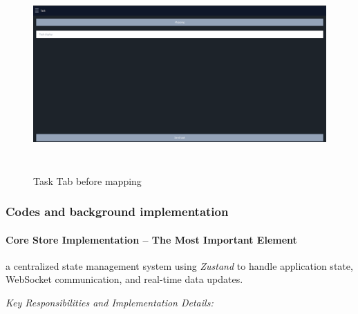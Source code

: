 \documentclass[../../main]{subfiles}
\begin{document}
    \begin{figure}[h!]
    \centering
    \includegraphics[width=6.26806in,height=2.93819in]{img/image007.png}
    \caption{Task Tab before mapping}
    \label{judFig4}
    \end{figure}
    
    \subsubsection{Codes and background implementation}
    
    \paragraph{Core Store Implementation -- The Most Important Element}

    a centralized state management system using \emph{Zustand} to handle
application state, WebSocket communication, and real-time data updates.

\emph{Key Responsibilities and Implementation Details:}
\end{document}
